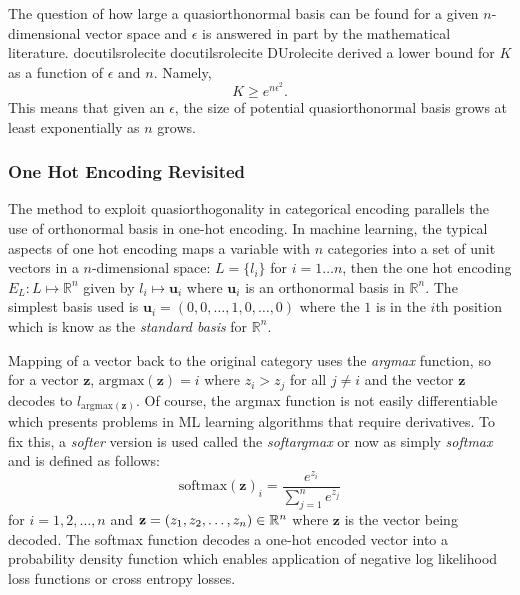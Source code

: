 \documentclass[]{article}
\providecommand*{\DUrole}[2]{%
  \ifcsname docutilsrole#1\endcsname%
    \csname docutilsrole#1\endcsname{#2}%
  \else
    \csname DUrole#1\endcsname{#2}%
  \fi%
}
\begin{document}
The question of how large a quasiorthonormal basis can be found for a given $n$-dimensional vector space and $\epsilon$ is answered in part by the mathematical literature. \DUrole{cite}{Kainen2020} derived a lower bound for $K$ as a function of $\epsilon$
and $n$. Namely,\begin{equation*}
K \ge e^{n\epsilon^2}.
\end{equation*}This means that given an $\epsilon$, the size of potential quasiorthonormal basis grows at least exponentially as $n$ grows.

\subsubsection{One Hot Encoding Revisited%
  \label{one-hot-encoding-revisited}%
}


The method to exploit quasiorthogonality in categorical encoding
parallels the use of orthonormal basis in one-hot encoding. In machine
learning, the typical aspects of one hot encoding maps a
variable with $n$ categories into a set of unit vectors in a
$n$-dimensional space: $L=\{l_i\}$ for $i=1\ldots n$,
then the one hot encoding $E_L:L \mapsto \mathbb{R}^n$
given by $l_i \mapsto \mathbf{u}_i$ where $\mathbf{u}_i$ is
an orthonormal basis in $\mathbb{R}^n$. The simplest basis used is
$\mathbf{u}_i = (0,0,\ldots, 1, 0,\ldots, 0)$ where the $1$
is in the $i$th position which is know as the \emph{standard basis}
for $\mathbb{R}^n$.

Mapping of a vector back to the original category uses the \emph{argmax}
function, so for a vector $\mathbf{z}$,
$\mathrm{argmax}(\mathbf{z}) = i$ where $z_i>z_j$ for all
$j\ne i$ and the vector $\mathbf{z}$ decodes to
$l_{\mathrm{argmax}(\mathbf{z})}$. Of course, the argmax function
is not easily differentiable which presents problems in ML learning algorithms
that require derivatives. To fix this, a \emph{softer} version is used called
the \emph{softargmax} or now as simply \emph{softmax} and is defined as follows:\begin{equation}
\label{eq:csoftmax}
\mathrm{softmax}(\mathbf{z})_i=\frac{e^{z_i}}{\sum_{j=1}^n e^{z_j}}
\end{equation}for $i=1,2,\ldots,n$ and
${\bf z}=(z_1, z_2,\ldots, z_n) \in \mathbb{R}^n$ where
$\mathbf{z}$ is the vector being decoded. The softmax function
decodes a one-hot encoded vector into a probability density function
which enables application of negative log likelihood loss functions or
cross entropy losses.
\end{document}
